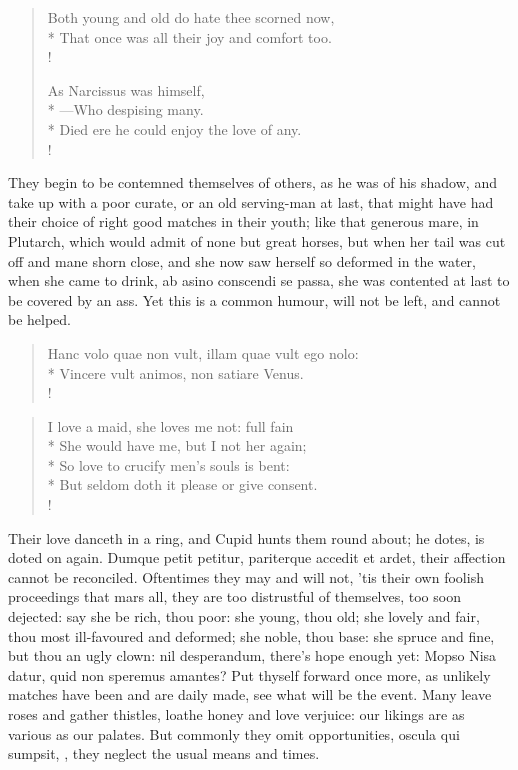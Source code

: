 \begin{verse}%
Both young and old do hate thee scorned now,\\*
That once was all their joy and comfort too.\\!

As Narcissus was himself,\\*
---Who despising many.\\*
Died ere he could enjoy the love of any.\\!
\end{verse}%
%
They begin to be contemned themselves of others, as he was of his
shadow, and take up with a poor curate, or an old serving-man at last,
that might have had their choice of right good matches in their youth;
like that generous mare, in Plutarch, which would admit of none
but great horses, but when her tail was cut off and mane shorn close,
and she now saw herself so deformed in the water, when she came to
drink, ab asino conscendi se passa, she was contented at last to be
covered by an ass. Yet this is a common humour, will not be left, and
cannot be helped.
%
\begin{latin}%
\begin{verse}%
Hanc volo quae non vult, illam quae vult ego nolo:\\*
Vincere vult animos, non satiare Venus.\\!
\end{verse}%
\end{latin}%
\translationrule%
\begin{verse}%
I love a maid, she loves me not: full fain\\*
She would have me, but I not her again;\\*
So love to crucify men's souls is bent:\\*
But seldom doth it please or give consent.\\!
\end{verse}%
%

Their love danceth in a ring, and Cupid hunts them round about; he
dotes, is doted on again. Dumque petit petitur, pariterque accedit et
ardet, their affection cannot be reconciled. Oftentimes they may and
will not, 'tis their own foolish proceedings that mars all, they are
too distrustful of themselves, too soon dejected: say she be rich, thou
poor: she young, thou old; she lovely and fair, thou most ill-favoured
and deformed; she noble, thou base: she spruce and fine, but thou an
ugly clown: nil desperandum, there's hope enough yet: Mopso Nisa datur,
quid non speremus amantes? Put thyself forward once more, as unlikely
matches have been and are daily made, see what will be the event. Many
leave roses and gather thistles, loathe honey and love verjuice: our
likings are as various as our palates. But commonly they omit
opportunities, oscula qui sumpsit, \etc{}, they neglect the usual means
and times.

